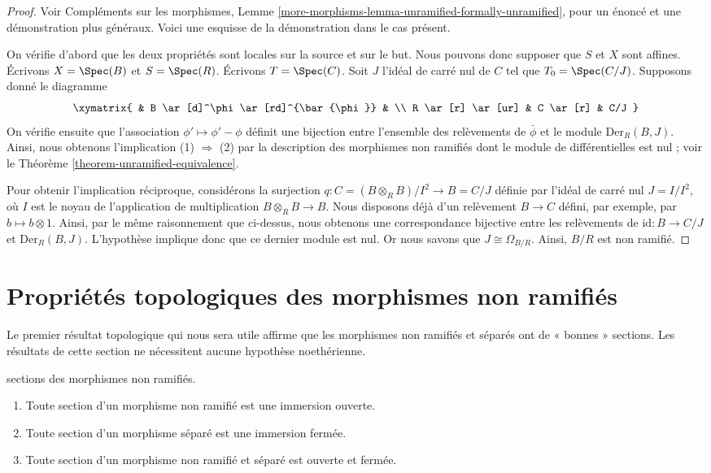 \begin{proof}
Voir Compléments sur les morphismes,
Lemme \ref{more-morphisms-lemma-unramified-formally-unramified},
pour un énoncé et une démonstration plus généraux.
Voici une esquisse de la démonstration dans le cas présent.

\medskip\noindent
On vérifie d'abord que les deux propriétés sont locales sur la source et sur le but.
Nous pouvons donc supposer que $S$ et $X$ sont affines.
Écrivons $X = \Spec(B)$ et $S = \Spec(R)$.
Écrivons $T = \Spec(C)$. Soit $J$ l'idéal de carré nul de $C$
tel que $T_0 = \Spec(C/J)$. Supposons donné le diagramme
$$
\xymatrix{
& B \ar[d]^\phi \ar[rd]^{\bar{\phi}}
& \\
R \ar[r] \ar[ur] & C \ar[r]
& C/J
}
$$
On vérifie ensuite que l'association $\phi' \mapsto \phi' - \phi$
définit une bijection entre l'ensemble des relèvements de $\bar{\phi}$ et le module
$\text{Der}_R(B, J)$. Ainsi, nous obtenons l'implication (1) $\Rightarrow$ (2)
par la description des morphismes non ramifiés dont le module
de différentielles est nul ; voir le Théorème \ref{theorem-unramified-equivalence}.

\medskip\noindent
Pour obtenir l'implication réciproque, considérons la surjection
$q : C = (B \otimes_R B)/I^2 \to B = C/J$ définie par l'idéal de carré nul
$J = I/I^2$, où $I$ est le noyau de l'application de multiplication
$B \otimes_R B \to B$. Nous disposons déjà d'un relèvement $B \to C$ défini, par exemple,
par $b \mapsto b \otimes 1$. Ainsi, par le même raisonnement que ci-dessus, nous obtenons une
correspondance bijective entre les relèvements de $\text{id} : B \to C/J$ et
$\text{Der}_R(B, J)$. L'hypothèse implique donc que ce dernier module est
nul. Or nous savons que $J \cong \Omega_{B/R}$. Ainsi, $B/R$ est non ramifié.
\end{proof}



\section{Propriétés topologiques des morphismes non ramifiés}
\label{section-topological-unramified}

\noindent
Le premier résultat topologique qui nous sera utile affirme
que les morphismes non ramifiés et séparés ont de « bonnes » sections.
Les résultats de cette section ne nécessitent aucune hypothèse noethérienne.

\begin{proposition}
\label{proposition-properties-sections}
sections des morphismes non ramifiés.
\begin{enumerate}
\item Toute section d'un morphisme non ramifié est une immersion ouverte.
\item Toute section d'un morphisme séparé est une immersion fermée.
\item Toute section d'un morphisme non ramifié et séparé est ouverte et fermée.
\end{enumerate}
\end{proposition}

